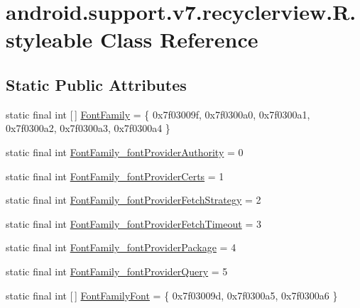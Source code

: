 \hypertarget{classandroid_1_1support_1_1v7_1_1recyclerview_1_1R_1_1styleable}{}\section{android.\+support.\+v7.\+recyclerview.\+R.\+styleable Class Reference}
\label{classandroid_1_1support_1_1v7_1_1recyclerview_1_1R_1_1styleable}
\subsection*{Static Public Attributes}
\begin{DoxyCompactItemize}
\item 
static final int \mbox{[}$\,$\mbox{]} \mbox{\hyperlink{classandroid_1_1support_1_1v7_1_1recyclerview_1_1R_1_1styleable_a8669b92c2940f7b32cfaa23107b532bb}{Font\+Family}} = \{ 0x7f03009f, 0x7f0300a0, 0x7f0300a1, 0x7f0300a2, 0x7f0300a3, 0x7f0300a4 \}
\item 
static final int \mbox{\hyperlink{classandroid_1_1support_1_1v7_1_1recyclerview_1_1R_1_1styleable_aa367d79f89aec314ed6c7191af0a408a}{Font\+Family\+\_\+font\+Provider\+Authority}} = 0
\item 
static final int \mbox{\hyperlink{classandroid_1_1support_1_1v7_1_1recyclerview_1_1R_1_1styleable_a4b5e171f97d24812743bfee9e7f5270f}{Font\+Family\+\_\+font\+Provider\+Certs}} = 1
\item 
static final int \mbox{\hyperlink{classandroid_1_1support_1_1v7_1_1recyclerview_1_1R_1_1styleable_a19e3a7d9f321623b3116b1c67cf3453b}{Font\+Family\+\_\+font\+Provider\+Fetch\+Strategy}} = 2
\item 
static final int \mbox{\hyperlink{classandroid_1_1support_1_1v7_1_1recyclerview_1_1R_1_1styleable_adeadd9fd015f315cd4a9becba4c90738}{Font\+Family\+\_\+font\+Provider\+Fetch\+Timeout}} = 3
\item 
static final int \mbox{\hyperlink{classandroid_1_1support_1_1v7_1_1recyclerview_1_1R_1_1styleable_a6391837450ac04c9e3a6104981cf8d12}{Font\+Family\+\_\+font\+Provider\+Package}} = 4
\item 
static final int \mbox{\hyperlink{classandroid_1_1support_1_1v7_1_1recyclerview_1_1R_1_1styleable_ae1307c55dee7f8981ec38f10a71fa7f8}{Font\+Family\+\_\+font\+Provider\+Query}} = 5
\item 
static final int \mbox{[}$\,$\mbox{]} \mbox{\hyperlink{classandroid_1_1support_1_1v7_1_1recyclerview_1_1R_1_1styleable_a05b9428fa9f3333f27238fa913cc25c7}{Font\+Family\+Font}} = \{ 0x7f03009d, 0x7f0300a5, 0x7f0300a6 \}

\end{DoxyCompactItemize}
